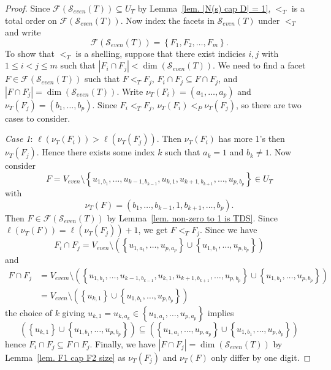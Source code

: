 \documentclass[12pt, reqno]{amsart}
\theoremstyle{definition}
\theoremstyle{plain}
\theoremstyle{definition}
\newcommand\set[1]{\left\lbrace #1 \right\rbrace}
\newcommand{\calS}{\mathcal{S}}
\begin{document}
\begin{proof}
    Since $\mathcal{F}(\calS_{even}(T)) \subseteq U_T $ by Lemma~\ref{lem. |N(s) cap D| = 1}, $<_T$ is a total order on $\mathcal{F}(\calS_{even}(T))$.
    Now index the facets in $\calS_{even}(T)$ under $<_T$ and write
    $$
    \mathcal{F}(\calS_{even}(T)) = \set{F_1,F_2,\dots,F_m}.
    $$
    To show that $<_T$ is a shelling, suppose that there exist indicies $i,j$ with $1 \leq i < j \leq m$ such that $|F_i \cap F_j| < \dim(\calS_{even}(T))$.
    We need to find a facet $F \in \mathcal{F}(\calS_{even}(T))$ such that $F <_T F_j$, $F_i \cap F_j \subseteq F \cap F_j$, and $|F \cap F_j| = \dim(\calS_{even}(T))$.
    Write $\nu_T(F_i) = (a_1,\dots,a_p)$ and $\nu_T(F_j) = (b_1,\dots,b_p)$.
    Since $F_i <_T F_j$, $\nu_T(F_i) <_P \nu_T(F_j)$, so there are two cases to consider.\newline
    
    \noindent\emph{Case 1}: $\ell(\nu_T(F_i)) > \ell(\nu_T(F_j))$.
    Then $\nu_T(F_i)$ has more 1's then $\nu_T(F_j)$.
    Hence there exists some index $k$ such that $a_k = 1$ and $b_k \neq 1$.
    Now consider 
    $$
    F = V_{even}\setminus \set{u_{1,b_1},\dots,u_{k-1,b_{k-1}}, u_{k,1}, u_{k+1,b_{k+1}},\dots,u_{p,b_p}} \in U_T 
    $$
    with
    $$
    \nu_T(F) = (b_1,\dots,b_{k-1},1,b_{k+1},\dots,b_p).
    $$
    Then $F \in \mathcal{F}(\calS_{even}(T))$ by Lemma~\ref{lem. non-zero to 1 is TDS}.
    Since $\ell(\nu_T(F)) = \ell(\nu_T(F_j)) + 1$, we get $F <_T F_j$.
    Since we have
    $$
    F_i \cap F_j = V_{even} \setminus \left( \set{u_{1,a_1},\dots,u_{p,a_p}} \cup \set{u_{1,b_1},\dots,u_{p,b_p}}\right)
    $$
    and
    \begin{align*}
        F \cap F_j &= V_{evem} \setminus \left(\set{u_{1,b_1},\dots,u_{k-1,b_{k-1}}, u_{k,1}, u_{k+1,b_{k+1}},\dots,u_{p,b_p}} \cup \set{u_{1,b_1},\dots,u_{p,b_p}} \right)\\ 
        &= V_{even} \setminus \left( \set{u_{k,1}}\cup\set{u_{1,b_1},\dots,u_{p,b_p}}\right)
    \end{align*}
    the choice of $k$ giving $u_{k,1} = u_{k,a_k} \in \set{u_{1,a_1},\dots,u_{p,a_p}}$ implies 
    $$
    \left( \set{u_{k,1}}\cup\set{u_{1,b_1},\dots,u_{p,b_p}}\right) \subseteq \left( \set{u_{1,a_1},\dots,u_{p,a_p}} \cup \set{u_{1,b_1},\dots,u_{p,b_p}}\right)
    $$
    hence $F_i \cap F_j \subseteq F \cap F_j$. 
    Finally, we have $|F \cap F_j| = \dim(\calS_{even}(T))$ by Lemma~\ref{lem. F1 cap F2 size} as $\nu_T(F_j)$ and $\nu_T(F)$ only differ by one digit.\newline


\end{proof}
\end{document}
